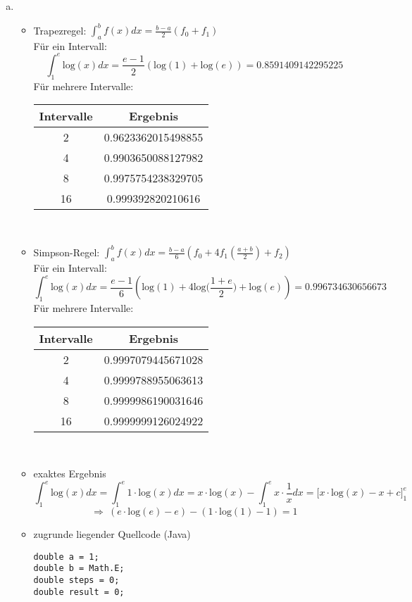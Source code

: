 \documentclass[a4paper,10pt]{article}
\begin{document}
	\begin{enumerate}[a)]
		\item 
		\begin{itemize}
			\item Trapezregel: $\int_{a}^{b} f(x) dx = \frac{b - a}{2}(f_0 + f_1)$ \\
			Für ein Intervall: 
			\[
			\int_{1}^{e}\mathrm{log}(x)dx = \dfrac{e - 1}{2}(\mathrm{log}(1) + \mathrm{log}(e)) = 0.8591409142295225
			\]
			Für mehrere Intervalle:\\
			\begin{tabular}{|c|c|}
				\hline 
				Intervalle & Ergebnis \\ 
				\hline 
				2 & 0.9623362015498855 \\ 
				\hline 
				4 & 0.9903650088127982 \\ 
				\hline 
				8 & 0.9975754238329705\\ 
				\hline 
				16 & 0.999392820210616\\ 
				\hline 
			\end{tabular} \\
			\item Simpson-Regel: $\int_{a}^{b} f(x) dx = \frac{b - a}{6}(f_0 + 4f_1(\frac{a + b}{2}) + f_2)$\\
			Für ein Intervall:
			\[
			\int_{1}^{e}\mathrm{log}(x)dx = \dfrac{e - 1}{6}(\mathrm{log}(1) + 4\mathrm{log}\Big(\frac{1+e}{2}\Big) + \mathrm{log}(e)) = 0.996734630656673
			\]
			Für mehrere Intervalle:\\
			\begin{tabular}{|c|c|}
				\hline 
				Intervalle & Ergebnis \\ 
				\hline 
				2 & 0.9997079445671028 \\ 
				\hline 
				4 & 0.9999788955063613 \\ 
				\hline 
				8 & 0.9999986190031646\\ 
				\hline 
				16 & 0.9999999126024922\\ 
				\hline 
			\end{tabular} \\
			\item exaktes Ergebnis\\
			\[
			\int^e_1 \mathrm{log}(x)dx = \int^e_1 1 \cdot \mathrm{log}(x)dx = x \cdot \mathrm{log}(x) - \int^e_1 x \cdot \frac{1}{x}dx = \big[x \cdot \mathrm{log}(x) - x + c \big]^e_1
			\]
			\[
			\Rightarrow \ (e \cdot \mathrm{log}(e) - e) - (1 \cdot \mathrm{log}(1) - 1) = 1
			\]
			\item 
			zugrunde liegender Quellcode (Java)
			\begin{lstlisting}
double a = 1;
double b = Math.E;
double steps = 0;
double result = 0;


\end{lstlisting}
\end{itemize}
\end{enumerate}
\end{document}
